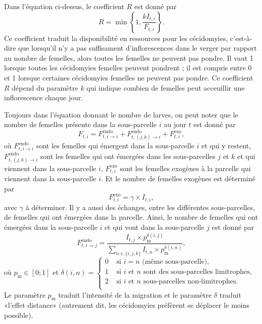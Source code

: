 Dans l'équation ci-dessus, le coefficient $R$ est donné par
\[
R = \min\!\left\{1, \frac{k I_{t, i}}{ F_{t, i}} \right\}\!.
\]
Ce coefficient traduit la disponibilité en ressources pour les cécidomyies, c'est-à-dire que lorsqu'il n'y a pas suffisament d'inflorescences dans le verger par rapport au nombre de femelles, alors toutes les femelles ne peuvent pas pondre.
Il vaut 1 lorsque toutes les cécidomyies femelles peuvent pondrent ; il est compris entre 0 et 1 lorsque certaines cécidomyies femelles ne peuvent pas pondre.
Ce coefficient $R$ dépend du paramètre $k$ qui indique combien de femelles peut acceuillir une inflorescence chaque jour.

Toujours dans l'équation donnant le nombre de larves, on peut noter que le nombre de femelles présente dans la sous-parcelle $i$ au jour $t$ est donné par
\[
F_{t, i} = F^{\text{endo}}_{t, i\rightarrow i} + F^{\text{endo}}_{t, (j,k)\rightarrow i} + F^{\text{exo}}_{t, i}\!,
\]
où $F^{\text{endo}}_{t, i\rightarrow i}$ sont les femelles qui émergent dans la sous-parcelle $i$ et qui y restent, $F^{\text{endo}}_{t, (j,k)\rightarrow i}$ sont les femelles qui ont émergées dans les sous-parcelles $j$ et $k$ et qui viennent dans la sous-parcelle $i$, $F^{\text{exo}}_{t, i}$ sont les femelles exogènes à la parcelle qui viennent dans la sous-parcelle $i$.
Et le nombre de femelles exogènes est déterminé par
\[
F^{\text{exo}}_{t, i} = \gamma \times I_{t, i},
\]
avec $\gamma$ à déterminer.
Il y a aussi des échanges, entre les différentes sous-parcelles, de femelles qui ont émergées dans la parcelle.
Ainsi, le nombre de femelles qui ont émergées dans la sous-parcelle $i$ et qui vont dans la sous-parcelle $j$ est donné par
\[
F_{t, i \rightarrow j}^{\text{endo}} = \frac{I_{t, j} \times p_{\text{m}}^{\delta(i, j)}}{\sum_{n\in \{i,j,k\}} I_{t, n} \times p_{\text{m}}^{\delta(i, n)}},
\]
où $p_{\text{m}} \in [0; 1]$ et $\delta(i, n) =
\begin{cases}
0 & \text{ si } i=n \text{ (même sous-parcelle),}\\
1 & \text{ si $i$ et $n$ sont des sous-parcelles limitrophes,}\\
2 & \text{ si $i$ et $n$ sous-parcelles non-limitrophes.}\\
\end{cases}$\\
Le paramètre $p_{\text{m}}$ traduit l'intensité de la migration et le paramètre $\delta$ traduit «l'effet distance» (autrement dit, les cécidomyies préfèrent se déplacer le moins possible).


